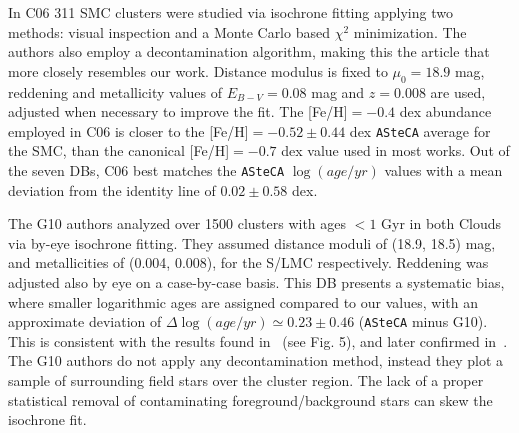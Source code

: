 \documentclass{aa}
\begin{document}
%
In C06 311 SMC clusters were studied via isochrone fitting
applying two methods: visual inspection and a Monte Carlo based $\chi^2$
minimization. The authors also employ a decontamination algorithm, making this
the article that more closely resembles our work.
Distance modulus is fixed to $\mu_0{=}18.9$ mag, reddening and
metallicity values of $E_{B-V}{=}0.08$ mag and $z{=}0.008$ are used, adjusted
when necessary to improve the fit.
The [Fe/H]${=}-0.4$ dex abundance employed in
C06 is closer to the [Fe/H]${=}-0.52{\pm}0.44$ dex \texttt{ASteCA} average
for the SMC, than the canonical [Fe/H]${=}-0.7$ dex value used in most works.
%
Out of the seven DBs, C06  best matches the \texttt{ASteCA}
$\log(age/yr)$ values with a mean deviation from the identity line of
$0.02\pm0.58$ dex.

%

The G10 authors analyzed over 1500 clusters with ages ${<}1$ Gyr in both Clouds
via by-eye isochrone fitting. They assumed distance moduli of (18.9, 18.5) mag,
and metallicities of (0.004, 0.008), for the S/LMC respectively. Reddening was
adjusted also by eye on a case-by-case basis.
This DB presents a systematic bias, where smaller logarithmic ages are
assigned compared to our values, with an approximate deviation of $\Delta
\log(age/yr){\simeq}0.23\pm0.46$ (\texttt{ASteCA} minus G10). This is consistent
with the results found in~\cite{Choudhury_2015} (see Fig. 5), and later
confirmed in~\cite{Piatti_2015a,Piatti_2015b}.
%
The G10 authors do not apply any decontamination method, instead they plot a
sample of surrounding field stars over the cluster region. The lack of a proper
statistical removal of contaminating foreground/background stars can
skew the isochrone fit.
\end{document}
